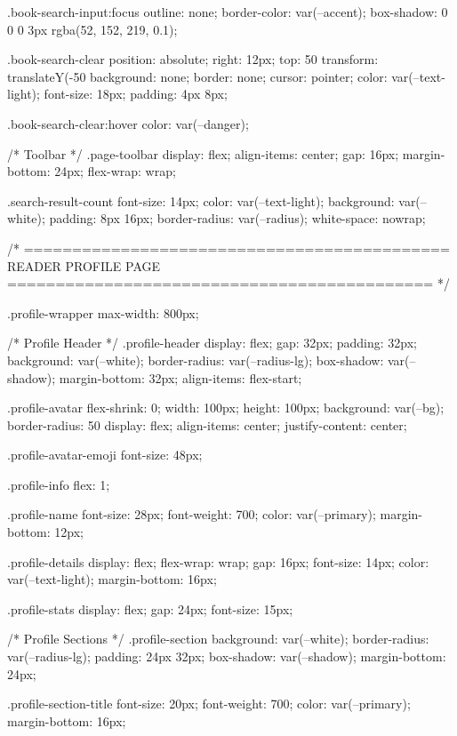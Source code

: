 .book-search-input:focus {
  outline: none;
  border-color: var(--accent);
  box-shadow: 0 0 0 3px rgba(52, 152, 219, 0.1);
}

.book-search-clear {
  position: absolute;
  right: 12px;
  top: 50%
  transform: translateY(-50%
  background: none;
  border: none;
  cursor: pointer;
  color: var(--text-light);
  font-size: 18px;
  padding: 4px 8px;
}

.book-search-clear:hover {
  color: var(--danger);
}

/* Toolbar */
.page-toolbar {
  display: flex;
  align-items: center;
  gap: 16px;
  margin-bottom: 24px;
  flex-wrap: wrap;
}

.search-result-count {
  font-size: 14px;
  color: var(--text-light);
  background: var(--white);
  padding: 8px 16px;
  border-radius: var(--radius);
  white-space: nowrap;
}


/* ============================================
   READER PROFILE PAGE
   ============================================ */

.profile-wrapper {
  max-width: 800px;
}

/* Profile Header */
.profile-header {
  display: flex;
  gap: 32px;
  padding: 32px;
  background: var(--white);
  border-radius: var(--radius-lg);
  box-shadow: var(--shadow);
  margin-bottom: 32px;
  align-items: flex-start;
}

.profile-avatar {
  flex-shrink: 0;
  width: 100px;
  height: 100px;
  background: var(--bg);
  border-radius: 50%
  display: flex;
  align-items: center;
  justify-content: center;
}

.profile-avatar-emoji {
  font-size: 48px;
}

.profile-info {
  flex: 1;
}

.profile-name {
  font-size: 28px;
  font-weight: 700;
  color: var(--primary);
  margin-bottom: 12px;
}

.profile-details {
  display: flex;
  flex-wrap: wrap;
  gap: 16px;
  font-size: 14px;
  color: var(--text-light);
  margin-bottom: 16px;
}

.profile-stats {
  display: flex;
  gap: 24px;
  font-size: 15px;
}

/* Profile Sections */
.profile-section {
  background: var(--white);
  border-radius: var(--radius-lg);
  padding: 24px 32px;
  box-shadow: var(--shadow);
  margin-bottom: 24px;
}

.profile-section-title {
  font-size: 20px;
  font-weight: 700;
  color: var(--primary);
  margin-bottom: 16px;
}

